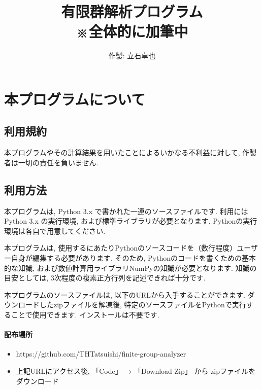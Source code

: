 \documentclass[11pt, a4paper]{jsarticle}
\title{
有限群解析プログラム\\
※全体的に加筆中
}
\author{
作製: 立石卓也
}
\begin{document}
\maketitle
\tableofcontents
\newpage
\section{本プログラムについて}

\subsection{利用規約}
本プログラムやその計算結果を用いたことによるいかなる不利益に対して, 作製者は一切の責任を負いません.

\subsection{利用方法} \label{sec:way}
本プログラムは, Python 3.x で書かれた一連のソースファイルです.
利用にはPython 3.x の実行環境, および標準ライブラリが必要となります.
Pythonの実行環境は各自で用意してください.

本プログラムは, 使用するにあたりPythonのソースコードを（数行程度）ユーザー自身が編集する必要があります.
そのため, Pythonのコードを書くための基本的な知識, および数値計算用ライブラリNumPyの知識が必要となります.
知識の目安としては, 3次程度の複素正方行列を記述できれば十分です.

本プログラムのソースファイルは, 以下のURLから入手することができます.
ダウンロードしたzipファイルを解凍後, 特定のソースファイルをPythonで実行することで使用できます.
インストールは不要です.

\paragraph{配布場所}
\begin{itemize}
\item https://github.com/THTatsuishi/finite-group-analyzer
\item 上記URLにアクセス後, 「Code」 → 「Download Zip」 から zipファイルをダウンロード
\end{itemize}
\end{document}

